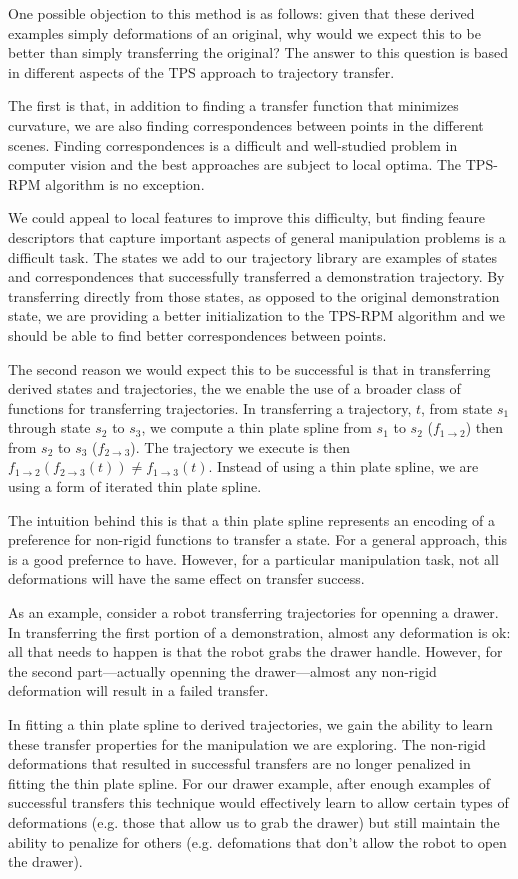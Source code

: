         

One possible objection to this method is as follows: given that these derived examples
simply deformations of an original, why would we expect this to be better than simply
transferring the original? The answer to this question is based in different
aspects of the TPS approach to trajectory transfer.

The first is that, in addition to finding a transfer function that minimizes curvature,
we are also finding correspondences between points in the different scenes. Finding 
correspondences is a difficult and well-studied problem in computer vision and the best
approaches are subject to local optima. The TPS-RPM algorithm is no exception. 

We could appeal to local features to improve this difficulty, but finding feaure descriptors 
that capture important aspects of general manipulation problems is a difficult task. The
states we add to our trajectory library are examples of states and correspondences that 
successfully transferred a demonstration trajectory. By transferring directly from those
states, as opposed to the original demonstration state, we are providing a better 
initialization to the TPS-RPM algorithm and we should be able to find better correspondences
between points.

The second reason we would expect this to be successful is that in transferring derived
states and trajectories, the we enable the use of a broader class of functions for 
transferring trajectories. In transferring a trajectory, $t$, from state $s_1$ through
state $s_2$ to $s_3$, we compute a thin plate spline from $s_1$ to $s_2$ 
($f_{1\rightarrow 2}$) then from $s_2$ to $s_3$ ($f_{2\rightarrow 3}$). The trajectory we
execute is then $f_{1\rightarrow 2}(f_{2\rightarrow 3}(t)) \ne f_{1\rightarrow 3}(t)$. 
Instead of using a thin plate spline, we are using a form of iterated thin plate spline.

The intuition behind this is that a thin plate spline represents an encoding of a preference
for non-rigid functions to transfer a state. For a general approach, this is a good
prefernce to have. However, for a particular manipulation task, not all deformations
will have the same effect on transfer success. 

As an example, consider a robot transferring
trajectories for openning a drawer. In transferring the first portion of a demonstration,
almost any deformation is ok: all that needs to happen is that the robot grabs the drawer handle.
However, for the second part---actually openning the drawer---almost any non-rigid deformation
will result in a failed transfer.

In fitting a thin plate spline to derived trajectories, we gain the ability 
to learn these transfer properties for the manipulation we are exploring.
The non-rigid deformations that resulted in successful transfers are no longer
penalized in fitting the thin plate spline. For our drawer example, after enough
examples of successful transfers this technique would effectively learn to allow
certain types of deformations (e.g. those that allow us to grab the drawer) but still
maintain the ability to penalize for others (e.g. defomations that don't allow the robot to
open the drawer).


